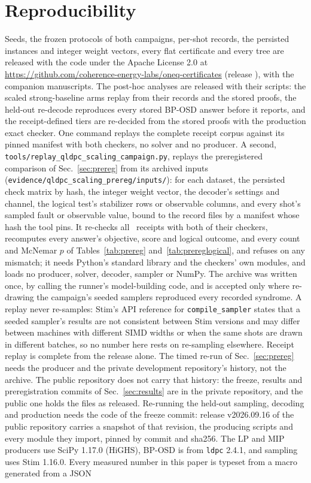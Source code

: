 \documentclass[aps,pra,twocolumn,superscriptaddress,nofootinbib,longbibliography,floatfix]{revtex4-2}
\begin{document}
\section{Reproducibility}
\label{sec:repro}

Seeds, the frozen protocols of both campaigns, per-shot records, the persisted instances and integer weight vectors, every flat certificate and every tree are released with the code under the Apache License 2.0 at \url{https://github.com/coherence-energy-labs/oneq-certificates} (release \ReleaseTag), with the companion manuscripts. The post-hoc analyses are released with their scripts: the scaled strong-baseline arms replay from their records and the stored proofs, the held-out re-decode reproduces every stored BP-OSD answer before it reports, and the receipt-defined tiers are re-decided from the stored proofs with the production exact checker. One command replays the complete receipt corpus against its pinned manifest with both checkers, no solver and no producer. A second, \texttt{tools/replay\_qldpc\_scaling\_campaign.py}, replays the preregistered comparison of Sec.~\ref{sec:prereg} from its archived inputs (\nolinkurl{evidence/qldpc_scaling_prereg/inputs/}): for each dataset, the persisted check matrix by hash, the integer weight vector, the decoder's settings and channel, the logical test's stabilizer rows or observable columns, and every shot's sampled fault or observable value, bound to the record files by a manifest whose hash the tool pins. It re-checks all \PrShots\ receipts with both of their checkers, recomputes every answer's objective, score and logical outcome, and every count and McNemar $p$ of Tables~\ref{tab:prereg} and~\ref{tab:prereglogical}, and refuses on any mismatch; it needs Python's standard library and the checkers' own modules, and loads no producer, solver, decoder, sampler or NumPy. The archive was written once, by calling the runner's model-building code, and is accepted only where re-drawing the campaign's seeded samplers reproduced every recorded syndrome. A replay never re-samples: Stim's API reference for \texttt{compile\_sampler} states that a seeded sampler's results are not consistent between Stim versions and may differ between machines with different SIMD widths or when the same shots are drawn in different batches, so no number here rests on re-sampling elsewhere. Receipt replay is complete from the release alone. The timed re-run of Sec.~\ref{sec:prereg} needs the producer and the private development repository's history, not the archive. The public repository does not carry that history: the freeze, results and preregistration commits of Sec.~\ref{sec:results} are in the private repository, and the public one holds the files as released. Re-running the held-out sampling, decoding and production needs the code of the freeze commit: release v2026.09.16 of the public repository carries a snapshot of that revision, the producing scripts and every module they import, pinned by commit and sha256. The LP and MIP producers use SciPy 1.17.0 (HiGHS), BP-OSD is from \texttt{ldpc} 2.4.1, and sampling uses Stim 1.16.0. Every measured number in this paper is typeset from a macro generated from a JSON 
\end{document}
